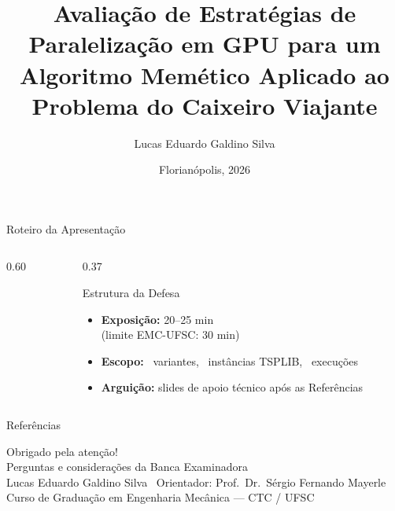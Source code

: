\documentclass[aspectratio=169,10pt]{beamer}
\title[Paralelização em GPU de AG+2-opt para o TSP]{%
  Avaliação de Estratégias de Paralelização em GPU para um Algoritmo Memético Aplicado ao Problema do Caixeiro Viajante%
}
\author[Lucas E. G. Silva]{Lucas Eduardo Galdino Silva}
\institute[UFSC / EMC]{Universidade Federal de Santa Catarina — Centro Tecnológico — EMC}
\date{Florianópolis, 2026}
\begin{document}
\begin{frame}
  \titlepage
\end{frame}

\begin{frame}{Roteiro da Apresentação}
  \begin{columns}[T,onlytextwidth]
    \begin{column}{0.60\textwidth}
      \tableofcontents[hideallsubsections]
    \end{column}
    \begin{column}{0.37\textwidth}
      \begin{block}{Estrutura da Defesa}
        \begin{itemize}
          \item \textbf{Exposição:} 20--25 min\\{\scriptsize(limite EMC-UFSC: 30 min)}
          \item \textbf{Escopo:} \totalvariantes\ variantes, \totalinstancias\ instâncias TSPLIB, \totalexecucoes\ execuções
          \item \textbf{Arguição:} slides de apoio técnico após as Referências
        \end{itemize}
      \end{block}
    \end{column}
  \end{columns}
\end{frame}







\begin{frame}[allowframebreaks]{Referências}
  \printbibliography[heading=none]
\end{frame}

\begin{frame}[standout]
  Obrigado pela atenção!\\[0.5cm]
  {\normalsize\normalfont Perguntas e considerações da Banca Examinadora}\\[0.7cm]
  {\footnotesize\normalfont
    Lucas Eduardo Galdino Silva \textbullet\ Orientador: Prof.~Dr.~Sérgio Fernando Mayerle\\
    Curso de Graduação em Engenharia Mecânica — CTC / UFSC
  }
\end{frame}

\appendix

\end{document}
